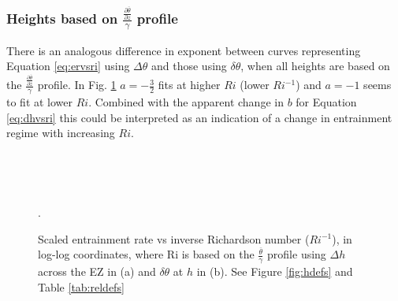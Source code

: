 \subsubsection{Heights based on $\frac{\frac{\partial \overline{\theta}}{\partial z}}{\gamma}$ profile}
There is an analogous difference in exponent between curves representing Equation \ref{eq:ervsri} using $\Delta \theta$ and those using $\delta \theta$, when all heights are based on the $\frac{\frac{\partial \overline{\theta}}{\partial z}}{\gamma}$ profile.  In Fig. \ref{fig:weinvri} $a=-\frac{3}{2}$ fits at higher $Ri$ (lower $Ri^{-1}$) and $a=-1$ seems to fit at lower $Ri$.  Combined with the apparent change in $b$ for Equation \ref{eq:dhvsri} this could be interpreted as an indication of a change in entrainment regime with increasing $Ri$.\\ 


\begin{figure}[htbp]
\begin{minipage}[b]{0.5\linewidth}
        \\
        \end{minipage}             
\quad
\begin{minipage}[b]{0.5\linewidth}
        \\
       
       \end{minipage}
        \caption[Scaled Entrainment Rate vs inverse Richardson Number (ii)]{Scaled entrainment rate vs inverse Richardson number ($Ri^{-1}$), in log-log coordinates, where  Ri  is based on the $\frac{\overline{\theta}}{\gamma}$
profile using $\Delta h$ across the EZ in (a) and $\delta \theta$ at $h$ in (b).  See Figure \ref{fig:hdefs} and Table \ref{tab:reldefs}
}. 
        \label{fig:weinvri}
\end{figure}

